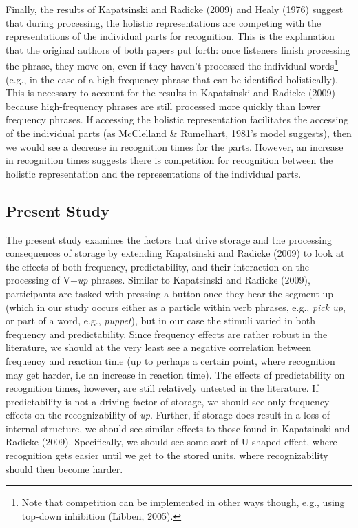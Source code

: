 \documentclass[
  man,floatsintext]{apa6}
\begin{document}
Finally, the results of Kapatsinski and Radicke (2009) and Healy (1976) suggest that during processing, the holistic representations are competing with the representations of the individual parts for recognition. This is the explanation that the original authors of both papers put forth: once listeners finish processing the phrase, they move on, even if they haven't processed the individual words\footnote{Note that competition can be implemented in other ways though, e.g., using top-down inhibition (Libben, 2005).} (e.g., in the case of a high-frequency phrase that can be identified holistically). This is necessary to account for the results in Kapatsinski and Radicke (2009) because high-frequency phrases are still processed more quickly than lower frequency phrases. If accessing the holistic representation facilitates the accessing of the individual parts (as McClelland \& Rumelhart, 1981's model suggests), then we would see a decrease in recognition times for the parts. However, an increase in recognition times suggests there is competition for recognition between the holistic representation and the representations of the individual parts.

\subsection{Present Study}\label{present-study}

The present study examines the factors that drive storage and the processing consequences of storage by extending Kapatsinski and Radicke (2009) to look at the effects of both frequency, predictability, and their interaction on the processing of V+\emph{up} phrases. Similar to Kapatsinski and Radicke (2009), participants are tasked with pressing a button once they hear the segment up (which in our study occurs either as a particle within verb phrases, e.g., \emph{pick up}, or part of a word, e.g., \emph{puppet}), but in our case the stimuli varied in both frequency and predictability. Since frequency effects are rather robust in the literature, we should at the very least see a negative correlation between frequency and reaction time (up to perhaps a certain point, where recognition may get harder, i.e an increase in reaction time). The effects of predictability on recognition times, however, are still relatively untested in the literature. If predictability is not a driving factor of storage, we should see only frequency effects on the recognizability of \emph{up}. Further, if storage does result in a loss of internal structure, we should see similar effects to those found in Kapatsinski and Radicke (2009). Specifically, we should see some sort of U-shaped effect, where recognition gets easier until we get to the stored units, where recognizability should then become harder.
\end{document}
